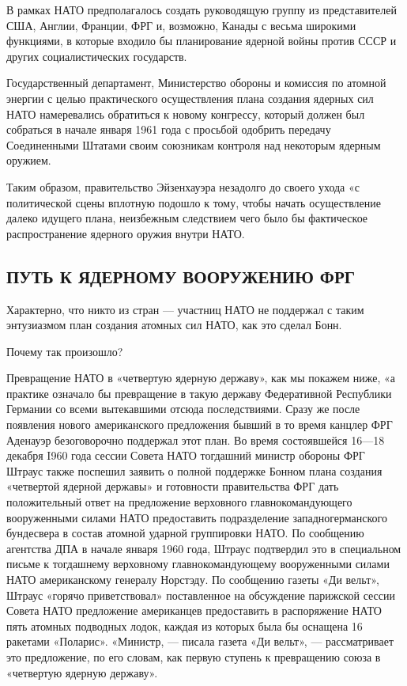 \documentclass[12pt, a4paper, openany]{book}
\begin{document}
	В рамках НАТО предполагалось создать руководящую группу из представителей США, Англии, Франции, ФРГ и, возможно, Канады с весьма широкими функциями, в которые входило бы планирование ядерной войны против СССР и других социалистических государств.
	
	Государственный департамент, Министерство обороны и комиссия по атомной энергии с целью практического осуществления плана создания ядерных сил НАТО намеревались обратиться к новому конгрессу, который должен был собраться в начале января 1961 года с просьбой одобрить передачу Соединенными Штатами своим союзникам контроля над некоторым ядерным оружием.
	
	Таким образом, правительство Эйзенхауэра незадолго до своего ухода «с политической сцены вплотную подошло к тому, чтобы начать осуществление далеко идущего плана, неизбежным следствием чего было бы фактическое распространение ядерного оружия внутри НАТО.
	
		\subsection[Путь к ядерному вооружению ФРГ]{\center ПУТЬ К ЯДЕРНОМУ ВООРУЖЕНИЮ ФРГ}
	
	
	
	
	Характерно, что никто из стран — участниц НАТО не поддержал с таким энтузиазмом план создания атомных сил НАТО, как это сделал Бонн.
	
	Почему так произошло?
	
	Превращение НАТО в «четвертую ядерную державу», как мы покажем ниже, «а практике означало бы превращение в такую державу Федеративной Республики Германии со всеми вытекавшими отсюда последствиями. Сразу же после появления нового американского предложения бывший в то время канцлер ФРГ Аденауэр безоговорочно поддержал этот план. Во время состоявшейся 16—18 декабря I960 года сессии Совета НАТО тогдашний министр обороны ФРГ Штраус также поспешил заявить о полной поддержке Бонном плана создания «четвертой ядерной державы» и готовности правительства ФРГ дать положительный ответ на предложение верховного главнокомандующего вооруженными силами НАТО предоставить подразделение западногерманского бундесвера в состав атомной ударной группировки НАТО. По сообщению агентства ДПА в начале января 1960 года, Штраус подтвердил это в специальном письме к тогдашнему верховному главнокомандующему вооруженными силами НАТО американскому генералу Норстэду. По сообщению газеты «Ди вельт», Штраус «горячо приветствовал» поставленное на обсуждение парижской сессии Совета НАТО предложение американцев предоставить в распоряжение НАТО пять атомных подводных лодок, каждая из которых была бы оснащена 16 ракетами «Поларис». «Министр, — писала газета «Ди вельт», — рассматривает это предложение, по его словам, как первую ступень к превращению союза в «четвертую ядерную державу».
	
\end{document}
